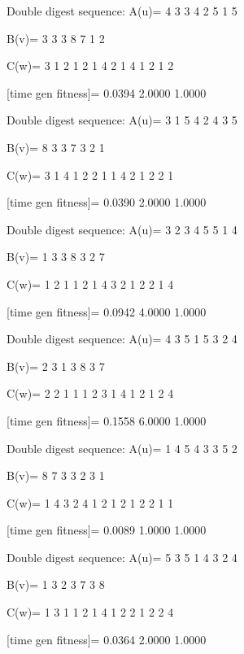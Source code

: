 Double digest sequence:
A(u)=
     4     3     3     4     2     5     1     5

B(v)=
     3     3     3     8     7     1     2

C(w)=
     3     1     2     1     2     1     4     2     1     4     1     2     1     2

[time gen fitness]=
    0.0394    2.0000    1.0000

Double digest sequence:
A(u)=
     3     1     5     4     2     4     3     5

B(v)=
     8     3     3     7     3     2     1

C(w)=
     3     1     4     1     2     2     1     1     4     2     1     2     2     1

[time gen fitness]=
    0.0390    2.0000    1.0000

Double digest sequence:
A(u)=
     3     2     3     4     5     5     1     4

B(v)=
     1     3     3     8     3     2     7

C(w)=
     1     2     1     1     2     1     4     3     2     1     2     2     1     4

[time gen fitness]=
    0.0942    4.0000    1.0000

Double digest sequence:
A(u)=
     4     3     5     1     5     3     2     4

B(v)=
     2     3     1     3     8     3     7

C(w)=
     2     2     1     1     1     2     3     1     4     1     2     1     2     4

[time gen fitness]=
    0.1558    6.0000    1.0000

Double digest sequence:
A(u)=
     1     4     5     4     3     3     5     2

B(v)=
     8     7     3     3     2     3     1

C(w)=
     1     4     3     2     4     1     2     1     2     1     2     2     1     1

[time gen fitness]=
    0.0089    1.0000    1.0000

Double digest sequence:
A(u)=
     5     3     5     1     4     3     2     4

B(v)=
     1     3     2     3     7     3     8

C(w)=
     1     3     1     1     2     1     4     1     2     2     1     2     2     4

[time gen fitness]=
    0.0364    2.0000    1.0000

